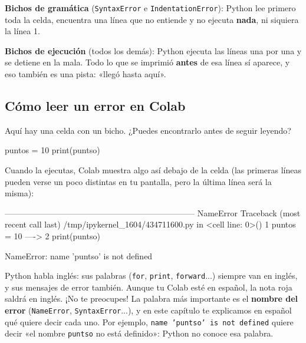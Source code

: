 \begin{think}
\textbf{Bichos de gramática} (\texttt{SyntaxError} e \texttt{IndentationError}): Python lee primero toda la celda, encuentra una línea que no entiende y no ejecuta \textbf{nada}, ni siquiera la línea 1.

\textbf{Bichos de ejecución} (todos los demás): Python ejecuta las líneas una por una y se detiene en la mala. Todo lo que se imprimió \textbf{antes} de esa línea sí aparece, y eso también es una pista: «llegó hasta aquí».
\end{think}

\subsection*{Cómo leer un error en Colab}

Aquí hay una celda con un bicho. ¿Puedes encontrarlo antes de seguir leyendo?

\begin{code}
puntos = 10
print(puntso)
\end{code}

Cuando la ejecutas, Colab muestra algo así debajo de la celda (las primeras líneas pueden verse un poco distintas en tu pantalla, pero la última línea será la misma):

\begin{bzcolab}
---------------------------------------------------------------------
NameError                         Traceback (most recent call last)
/tmp/ipykernel_1604/434711600.py in <cell line: 0>()
      1 puntos = 10
----> 2 print(puntso)

NameError: name 'puntso' is not defined
\end{bzcolab}

\begin{watchout}
Python habla inglés: sus palabras (\texttt{for}, \texttt{print}, \texttt{forward}...) siempre van en inglés, y sus mensajes de error también. Aunque tu Colab esté en español, la nota roja saldrá en inglés. ¡No te preocupes! La palabra más importante es el \textbf{nombre del error} (\texttt{NameError}, \texttt{SyntaxError}...), y en este capítulo te explicamos en español qué quiere decir cada uno. Por ejemplo, \texttt{name 'puntso' is not defined} quiere decir «el nombre \texttt{puntso} no está definido»: Python no conoce esa palabra.
\end{watchout}

